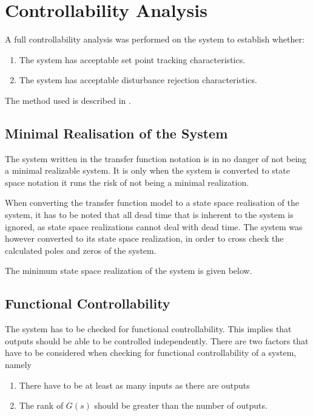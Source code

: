 \section{Controllability Analysis}

A full controllability analysis was performed on the system to establish whether:

\begin{enumerate}
	\item The system has acceptable set point tracking characteristics.
	\item The system has acceptable disturbance rejection characteristics.
\end{enumerate}

The method used is described in \textcite{skogestad}. 

\subsection{Minimal Realisation of the System}

The system written in the transfer function notation is in no danger of not being a minimal realizable system. It is only when the system is converted to state space notation it runs the risk of not being a minimal realization. 

When converting the transfer function model to a state space realisation of the system, it has to be noted that all dead time that is inherent to the system is ignored, as state space realizations cannot deal with dead time. The system was however converted to its state space realization, in order to cross check the calculated poles and zeros of the system.

The minimum state space realization of the system is given below.

\subsection{Functional Controllability}

The system has to be checked for functional controllability. This implies that outputs should be able to be controlled independently. There are two factors that have to be considered when checking for functional controllability of a system, namely

\begin{enumerate}
	\item There have to be at least as many inputs as there are outputs
	\item The rank of $G(s)$ should be greater than the number of outputs.
\end{enumerate} 

